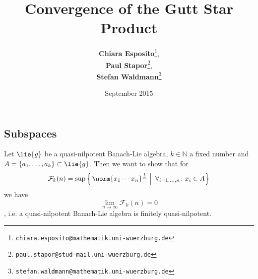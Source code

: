 \documentclass[
11pt,                          %
english                        %
]{article}
\title{Convergence of the Gutt Star Product}
\author{
  \textbf{Chiara Esposito}\thanks{\texttt{chiara.esposito@mathematik.uni-wuerzburg.de}},
  \addtocounter{footnote}{2}
  \textbf{Paul Stapor}\thanks{\texttt{paul.stapor@stud-mail.uni-wuerzburg.de}},
  \addtocounter{footnote}{2}
  \textbf{Stefan Waldmann}\thanks{\texttt{stefan.waldmann@mathematik.uni-wuerzburg.de}}\\[0.5cm]
  \chairXaddress
}
\date{September 2015}
\begin{document}
%
%

\maketitle

%
%


\subsection*{Subspaces}

Let $\lie{g}$ be a quasi-nilpotent Banach-Lie algebra, $k \in \mathbb{N}$ a fixed 
number and $A = \{a_1, \ldots, a_k\} \subset \lie{g}$. Then we want to show that
for
\begin{equation*}
	\mathcal{F}_k(n)
	=
	\sup
	\left\{
	\left.
		\norm{
			x_1 \cdots x_n
		}^{\frac{1}{n}}
	\ \right| \
		\forall_{i = 1, \ldots, n} 
		\colon
		x_i \in A
	\right\}
\end{equation*}
we have
\begin{equation*}
	\lim_{n \rightarrow \infty}
	\mathcal{F}_k(n)
	=
	0
\end{equation*},
i.e. a quasi-nilpotent Banach-Lie algebra is finitely quasi-nilpotent.
\end{document}
